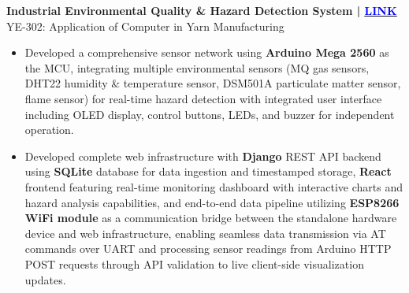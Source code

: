 \noindent
{\noindent\fontsize{12pt}{15pt}\bfseries Industrial Environmental Quality \& Hazard Detection System | \href{https://github.com/humam-hossain/arduino-env-hazard.git}{\underline{\textcolor{blue}{LINK}}}} \\
{\fontsize{9pt}{11pt}YE-302: Application of Computer in Yarn Manufacturing}
\begin{itemize}[leftmargin=1em, itemsep=0.1em, labelsep=0.5em]
    \item Developed a comprehensive sensor network using \textbf{Arduino Mega 2560} as the MCU, integrating multiple environmental sensors (MQ gas sensors, DHT22 humidity \& temperature sensor, DSM501A particulate matter sensor, flame sensor) for real-time hazard detection with integrated user interface including OLED display, control buttons, LEDs, and buzzer for independent operation.

    \item Developed complete web infrastructure with \textbf{Django} REST API backend using \textbf{SQLite} database for data ingestion and timestamped storage, \textbf{React} frontend featuring real-time monitoring dashboard with interactive charts and hazard analysis capabilities, and end-to-end data pipeline utilizing \textbf{ESP8266 WiFi module} as a communication bridge between the standalone hardware device and web infrastructure, enabling seamless data transmission via AT commands over UART and processing sensor readings from Arduino HTTP POST requests through API validation to live client-side visualization updates.
\end{itemize}